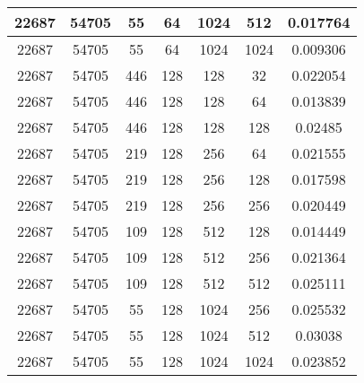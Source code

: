 \documentclass[9pt]{article}
\begin{document}
\begin{tabular}{|c|c|c|c|c|c|c| }
22687  & 54705  & 55  & 64  & 1024  & 512  & 0.017764 \\
\hline
22687  & 54705  & 55  & 64  & 1024  & 1024  & 0.009306 \\
\hline
22687  & 54705  & 446  & 128  & 128  & 32  & 0.022054 \\
\hline
22687  & 54705  & 446  & 128  & 128  & 64  & 0.013839 \\
\hline
22687  & 54705  & 446  & 128  & 128  & 128  & 0.02485 \\
\hline
22687  & 54705  & 219  & 128  & 256  & 64  & 0.021555 \\
\hline
22687  & 54705  & 219  & 128  & 256  & 128  & 0.017598 \\
\hline
22687  & 54705  & 219  & 128  & 256  & 256  & 0.020449 \\
\hline
22687  & 54705  & 109  & 128  & 512  & 128  & 0.014449 \\
\hline
22687  & 54705  & 109  & 128  & 512  & 256  & 0.021364 \\
\hline
22687  & 54705  & 109  & 128  & 512  & 512  & 0.025111 \\
\hline
22687  & 54705  & 55  & 128  & 1024  & 256  & 0.025532 \\
\hline
22687  & 54705  & 55  & 128  & 1024  & 512  & 0.03038 \\
\hline
22687  & 54705  & 55  & 128  & 1024  & 1024  & 0.023852 \\
\hline
\end{tabular}
 
\end{document}
